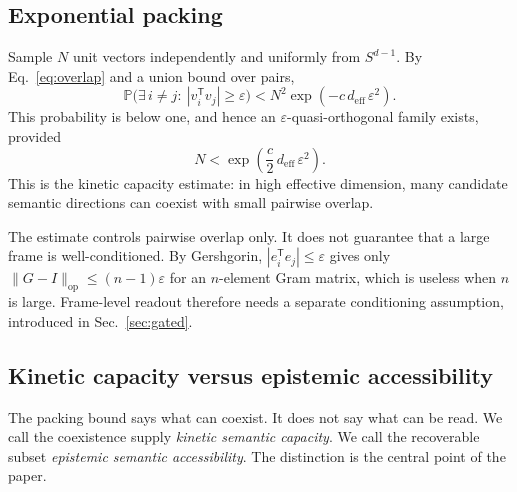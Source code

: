 \documentclass[
  aps,
  reprint,
  superscriptaddress,
  floatfix,
  nofootinbib,
  longbibliography
]{revtex4-2}
\newcommand{\Prob}{\mathbb{P}}
\newcommand{\Sph}[1]{S^{#1}}
\newcommand{\deff}{d_{\mathrm{eff}}}
\newcommand{\T}{^{\mathsf{T}}}
\newcommand{\opnorm}[1]{\lVert #1 \rVert_{\mathrm{op}}}
\begin{document}
\subsection{Exponential packing}
\label{sec:packing}

Sample $N$ unit vectors independently and uniformly from
$\Sph{d-1}$. By Eq.~\eqref{eq:overlap} and a union bound over pairs,
%
\begin{equation}
\label{eq:unionbound}
\Prob\bigl(\exists\,i\neq j:\ |v_i\T v_j|\ge\varepsilon\bigr)
 < N^{2}\exp(-c\,\deff\,\varepsilon^{2}).
\end{equation}
%
This probability is below one, and hence an
$\varepsilon$-quasi-orthogonal family exists, provided
%
\begin{equation}
\label{eq:packing}
N < \exp\!\left(\frac{c}{2}\,\deff\,\varepsilon^{2}\right).
\end{equation}
%
This is the kinetic capacity estimate: in high effective dimension,
many candidate semantic directions can coexist with small pairwise
overlap.

The estimate controls pairwise overlap only. It does not guarantee that
a large frame is well-conditioned. By Gershgorin,
$|e_i\T e_j|\le\varepsilon$ gives only
$\opnorm{G-I}\le(n-1)\varepsilon$ for an $n$-element Gram matrix, which
is useless when $n$ is large. Frame-level readout therefore needs a
separate conditioning assumption, introduced in Sec.~\ref{sec:gated}.

\subsection{Kinetic capacity versus epistemic accessibility}
\label{sec:kinetic-epistemic}

The packing bound says what can coexist. It does not say what can be
read. We call the coexistence supply \emph{kinetic semantic capacity}.
We call the recoverable subset \emph{epistemic semantic accessibility}.
The distinction is the central point of the paper.
\end{document}
